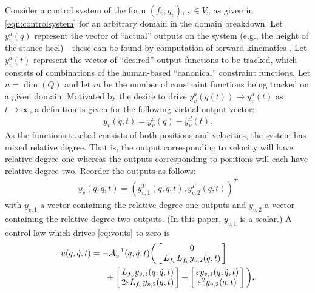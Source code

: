 Consider a control system of the form $(f_{v},g_{v})$, $v \in V_{u}$ as given in
\eqref{eqn:controlsystem} for an arbitrary domain in the domain breakdown. Let
$y^{a}_{v}(q)$ represent the vector of ``actual'' outputs on the system (e.g.,
the height of the stance heel)---these can be found by computation of forward
kinematics \cite{Murray94}. Let $y^{d}_{v}(t)$ represent the vector of
``desired'' output functions to be tracked, which consists of combinations of
the human-based ``canonical'' constraint functions. Let $n = \dim(Q)$ and let
$m$ be the number of constraint functions being tracked on a given
domain. Motivated by the desire to drive $y^{a}_{v}(q(t)) \to y^{d}_{v}(t)$ as
$t \to \infty$, a definition is given for the following virtual output vector:
\begin{align}
  \label{eq:virtout}
  y_v(q,t) = y^a_v(q) - y^d_v(t).
\end{align}
As the functions tracked consists of both positions and velocities, the system has mixed relative degree. That is, the output corresponding to velocity will have relative degree one whereas the outputs corresponding to positions will each have relative degree two. Reorder the outputs as follows:
\begin{align}
  \label{eq:vouts}
  y_v(q, {\dot q}, t) = (y_{v,1}^T(q, {\dot q}, t),y_{v,2}^T(q, t))^T
\end{align}
with $y_{v,1}$ a vector containing the relative-degree-one outputs and $y_{v,2}$ a vector containing the relative-degree-two outputs. (In this paper, $y_{v,1}$ is a scalar.) A control law which drives \eqref{eq:vouts} to zero is
\begin{align}
  \lefteqn{u(q, {\dot q}, t) = -\mathcal{A}_{v}^{-1}(q, {\dot q}, t)
  \bigg(\left[\!\!\begin{array}{c}
    0\\
    L_{f_{v}} L_{f_{v}} y_{v,2}(q, t)
    \end{array}\!\!\right]}\\
\nonumber
  &&\hspace{15mm}\mbox{}+ \left[\!\!\begin{array}{c}
        L_{f_{v}} y_{v,1}(q, {\dot q}, t)\\
        2 \varepsilon L_{f_{v}} y_{v,2}(q, t)
      \end{array}\!\!\right] +
  \left[\!\!\begin{array}{c}
    \varepsilon y_{v,1}(q, {\dot q}, t)\\
    \varepsilon^2 y_{v,2}(q, t)
    \end{array}\!\!\right]\bigg),
\end{align}
